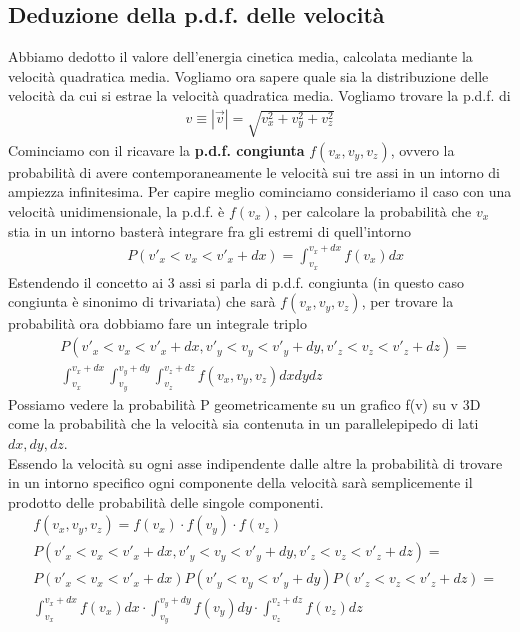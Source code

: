 \documentclass[10pt,a4paper]{article}
\begin{document}
\subsection{Deduzione della p.d.f. delle velocità}
Abbiamo dedotto il valore dell'energia cinetica media, calcolata mediante la velocità quadratica media. Vogliamo ora sapere quale sia la distribuzione delle velocità da cui si estrae la velocità quadratica media. Vogliamo trovare la p.d.f. di
\begin{align*} 
	v \equiv |\vec{v}| = \sqrt{v_x^2+v_y^2+v_z^2}
\end{align*} 
Cominciamo con il ricavare la \textbf{p.d.f. congiunta} $f(v_x, v_y, v_z)$, ovvero la probabilità di avere contemporaneamente le velocità sui tre assi in un intorno di ampiezza infinitesima. Per capire meglio cominciamo consideriamo il caso con una velocità unidimensionale, la p.d.f. è $f(v_x)$, per calcolare la probabilità che $v_x$ stia in un intorno basterà integrare fra gli estremi di quell'intorno
\begin{align*} 
	& P(v'_x<v_x<v'_x+dx)= \int_{v_x}^{v_x+dx}f(v_x)dx
\end{align*} 
Estendendo il concetto ai 3 assi si parla di p.d.f. congiunta (in questo caso congiunta è sinonimo di trivariata) che sarà $f(v_x, v_y, v_z)$, per trovare la probabilità ora dobbiamo fare un integrale triplo
\begin{align*} 
	&P(v'_x<v_x<v'_x+dx, v'_y<v_y<v'_y+dy, v'_z<v_z<v'_z+dz) =\\
	&\int_{v_x}^{v_x+dx}\int_{v_y}^{v_y+dy}\int_{v_z}^{v_z+dz} f(v_x,v_y,v_z) dxdydz
\end{align*} 
Possiamo vedere la probabilità P geometricamente su un grafico f(v) su v 3D come la probabilità che la velocità sia contenuta in un parallelepipedo di lati $dx, dy, dz$.\\
Essendo la velocità su ogni asse indipendente dalle altre la probabilità di trovare in un intorno specifico ogni componente della velocità sarà semplicemente il prodotto delle probabilità delle singole componenti.
\begin{align}\label{eq:cond1}
	&f(v_x, v_y, v_z) = f(v_x)\cdot f(v_y)\cdot f(v_z)\\
	& P(v'_x<v_x<v'_x+dx, v'_y<v_y<v'_y+dy, v'_z<v_z<v'_z+dz) =\nonumber\\ 
	&P(v'_x<v_x<v'_x+dx) P(v'_y<v_y<v'_y+dy) P(v'_z<v_z<v'_z+dz)=\nonumber\\
	&\int_{v_x}^{v_x+dx} f(v_x)dx \cdot \int_{v_y}^{v_y+dy}f(v_y)dy \cdot \int_{v_z}^{v_z+dz}f(v_z)dz\nonumber
\end{align} 
\end{document}
